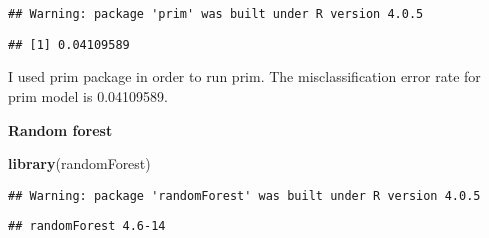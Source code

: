 \documentclass[
]{article}
\newenvironment{Shaded}{\begin{snugshade}}{\end{snugshade}}
\newcommand{\DataTypeTok}[1]{\textcolor[rgb]{0.13,0.29,0.53}{#1}}
\newcommand{\DecValTok}[1]{\textcolor[rgb]{0.00,0.00,0.81}{#1}}
\newcommand{\FloatTok}[1]{\textcolor[rgb]{0.00,0.00,0.81}{#1}}
\newcommand{\KeywordTok}[1]{\textcolor[rgb]{0.13,0.29,0.53}{\textbf{#1}}}
\newcommand{\NormalTok}[1]{#1}
\newcommand{\OperatorTok}[1]{\textcolor[rgb]{0.81,0.36,0.00}{\textbf{#1}}}
\newcommand{\StringTok}[1]{\textcolor[rgb]{0.31,0.60,0.02}{#1}}
\begin{document}
\begin{verbatim}
## Warning: package 'prim' was built under R version 4.0.5
\end{verbatim}

\begin{Shaded}
\end{Shaded}

\begin{verbatim}
## [1] 0.04109589
\end{verbatim}

I used prim package in order to run prim. The misclassification error
rate for prim model is 0.04109589.

\textbf{Random forest}

\begin{Shaded}
\begin{Highlighting}[]
\KeywordTok{library}\NormalTok{(randomForest)}
\end{Highlighting}
\end{Shaded}

\begin{verbatim}
## Warning: package 'randomForest' was built under R version 4.0.5
\end{verbatim}

\begin{verbatim}
## randomForest 4.6-14
\end{verbatim}
\end{document}
